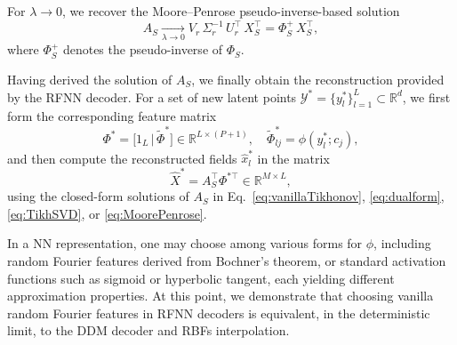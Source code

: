 \documentclass{article}
\begin{document}
For $\lambda \to 0$, we recover the Moore–Penrose pseudo-inverse-based solution
\begin{equation}
A_S\xrightarrow[\lambda\to 0]{} V_r\,\Sigma_r^{-1}\,U_r^\top\, X^{\top}_S= 
\Phi_S^{+}\,X^{\top}_S,
\label{eq:MoorePenrose}
\end{equation}
where $\Phi_S^{+}$ denotes the pseudo-inverse of $\Phi_S$.

Having derived the solution of $A_S$, we finally obtain the reconstruction provided by the RFNN decoder. For a set of new latent points $\mathcal{Y}^*=\{ y^*_l\}_{l=1}^L\subset\mathbb{R}^d$, we first form the corresponding feature matrix
\begin{equation}
    \Phi^* = \big[1_L \, | \, \widetilde{\Phi}^* \big]
\in\mathbb{R}^{L\times (P+1)}, \quad \widetilde{\Phi}_{lj}^*=\phi(y^*_{l}; c_{j}),
\end{equation}
and then compute the reconstructed fields $\hat{x}^*_l$ in the matrix
\begin{equation}
\widehat{X}^* = A^{\top}_S \Phi^{*\top} \in \mathbb{R}^{M \times L},
\label{eq:RFNN_dec}
\end{equation}
using the closed-form solutions of $A_S$ in Eq.~\eqref{eq:vanillaTikhonov}, \eqref{eq:dualform}, \eqref{eq:TikhSVD}, or \eqref{eq:MoorePenrose}.

In a NN representation, one may choose among various forms for $\phi$, including random Fourier features derived from Bochner's theorem, or standard activation functions such as sigmoid or hyperbolic tangent, each yielding different approximation properties. %
At this point, we demonstrate that choosing vanilla random Fourier features in RFNN decoders is equivalent, in the deterministic limit, to the DDM decoder and RBFs interpolation.
\end{document}
